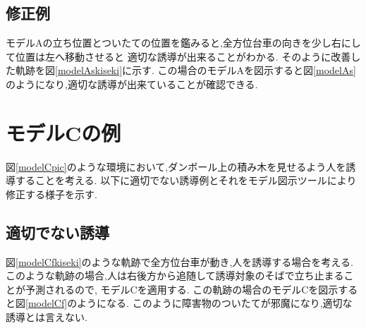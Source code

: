 \subsection{修正例}
モデルAの立ち位置とついたての位置を鑑みると,全方位台車の向きを少し右にして位置は左へ移動させると
適切な誘導が出来ることがわかる.
そのように改善した軌跡を図\ref{modelAskiseki}に示す.
この場合のモデルAを図示すると図\ref{modelAs}のようになり,適切な誘導が出来ていることが確認できる.



\begin{comment}
\begin{figure}[htbp]
 \begin{minipage}{0.5\hsize}
\begin{center}
\texttt{[image: modelAskiseki.eps]}
\caption{モデルAにおける適切な誘導の軌跡}
\label{modelAskiseki}
\end{center}
 \end{minipage}
 \begin{minipage}{0.5\hsize}
\begin{center}
\texttt{[image: modelAs.eps]}
\caption{モデルAの図示(適切な例)}
\label{modelAs}
\end{center}
 \end{minipage}
\end{figure}
\end{comment}

\section{モデルCの例}
図\ref{modelCpic}のような環境において,ダンボール上の積み木を見せるよう人を誘導することを考える.
以下に適切でない誘導例とそれをモデル図示ツールにより修正する様子を示す.

\begin{comment}
\begin{figure}[!h]
\begin{center}
\texttt{[image: modelCpic.eps]}
\caption{モデルC検証環境}
\label{modelCpic}
\end{center}
\end{figure}
\end{comment}

\subsection{適切でない誘導}
図\ref{modelCfkiseki}のような軌跡で全方位台車が動き,人を誘導する場合を考える.
このような軌跡の場合,人は右後方から追随して誘導対象のそばで立ち止まることが予測されるので,
モデルCを適用する.
この軌跡の場合のモデルCを図示すると図\ref{modelCf}のようになる.
このように障害物のついたてが邪魔になり,適切な誘導とは言えない.

